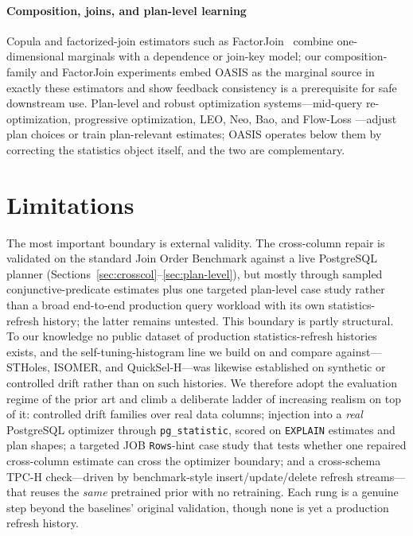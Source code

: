 \documentclass[preprint,12pt]{elsarticle}
\begin{document}
\paragraph{Composition, joins, and plan-level learning}
Copula and factorized-join estimators such as FactorJoin~\cite{wu2023factorjoin} combine
one-dimensional marginals with a dependence or join-key model; our composition-family and
FactorJoin experiments embed OASIS as the marginal source in exactly these estimators and
show feedback consistency is a prerequisite for safe downstream use. Plan-level and robust
optimization systems---mid-query re-optimization, progressive optimization, LEO, Neo, Bao,
and Flow-Loss
\cite{kabra1998efficient,markl2004progressive,babcock2005robust,stillger2001leo,marcus2019neo,marcus2022bao,negi2021flowloss,lee2023impact}---adjust
plan choices or train plan-relevant estimates; OASIS operates below them by correcting the
statistics object itself, and the two are complementary.

\section{Limitations}
\label{sec:limitations}

The most important boundary is external validity. The cross-column repair is validated on
the standard Join Order Benchmark against a live PostgreSQL planner
(Sections~\ref{sec:crosscol}--\ref{sec:plan-level}), but mostly through sampled
conjunctive-predicate estimates plus one targeted plan-level case study rather than a broad
end-to-end production query workload with its own statistics-refresh history; the latter
remains untested. This boundary is partly structural. To our knowledge no public dataset of production statistics-refresh histories
exists, and the self-tuning-histogram line we build on and compare against---STHoles,
ISOMER, and QuickSel-H---was likewise established on synthetic or controlled drift rather
than on such histories. We therefore adopt the evaluation regime of the prior art and
climb a deliberate ladder of increasing realism on top of it: controlled drift families over
real data columns; injection into a \emph{real}
PostgreSQL optimizer through \texttt{pg\_statistic}, scored on \texttt{EXPLAIN} estimates
and plan shapes; a targeted JOB \texttt{Rows}-hint case study that tests whether one repaired
cross-column estimate can cross the optimizer boundary; and a cross-schema TPC-H check---driven by benchmark-style
insert/update/delete refresh streams---that reuses the \emph{same} pretrained prior
with no retraining. Each rung is a
genuine step beyond the baselines' original validation, though none is yet a production refresh
history.
\end{document}
